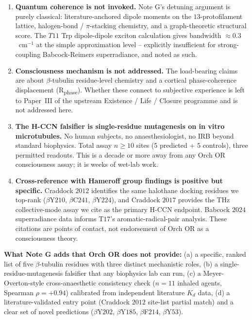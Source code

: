 \documentclass[11pt,a4paper]{article}
\begin{document}
\begin{enumerate}\itemsep0pt
  \item \textbf{Quantum coherence is not invoked.} Note G's
    detuning argument is purely classical: literature-anchored dipole
    moments on the $13$-protofilament lattice, halogen-bond / $\pi$-stacking
    chemistry, and a graph-theoretic structural score. The $T11$ Trp
    dipole-dipole exciton calculation gives bandwidth $\approx 0.3$~cm$^{-1}$
    at the simple approximation level -- explicitly insufficient for
    strong-coupling Babcock-Reimers superradiance, and noted as such.
  \item \textbf{Consciousness mechanism is not addressed.} The
    load-bearing claims are about $\beta$-tubulin residue-level chemistry
    and a cortical phase-coherence displacement (R\textsubscript{phase}).
    Whether these connect to subjective experience is left to Paper~III
    of the upstream Existence / Life / Closure programme and is not
    addressed here.
  \item \textbf{The H-CCN falsifier is single-residue mutagenesis on
    in vitro microtubules.} No human subjects, no anaesthesiologist,
    no IRB beyond standard biophysics. Total assay $n \geq 10$ sites
    (5 predicted + 5 controls), three permitted readouts. This is a
    decade or more away from any Orch OR consciousness assay; it is
    weeks of wet-lab work.
  \item \textbf{Cross-reference with Hameroff group findings is positive
    but specific.} Craddock $2012$ identifies the same halothane
    docking residues we top-rank ($\beta$Y$210$, $\beta$C$241$,
    $\beta$Y$224$), and Craddock $2017$ provides the THz collective-mode
    assay we cite as the primary H-CCN endpoint. Babcock $2024$
    superradiance data informs T$17$'s aromatic-radical-pair analysis.
    These citations are points of contact, not endorsement of Orch OR
    as a consciousness theory.
\end{enumerate}

\textbf{What Note G adds that Orch OR does not provide:} (a) a specific,
ranked list of five $\beta$-tubulin residues with three distinct mechanistic
roles, (b) a single-residue-mutagenesis falsifier that any biophysics lab
can run, (c) a Meyer-Overton-style cross-anaesthetic consistency check
($n=11$ inhaled agents, Spearman $\rho = +0.94$) calibrated from independent
literature $K_d$ data, (d) a literature-validated entry point (Craddock
$2012$ site-list partial match) and a clear set of novel predictions
($\beta$Y$202$, $\beta$Y$185$, $\beta$F$214$, $\beta$Y$53$).
\end{document}
